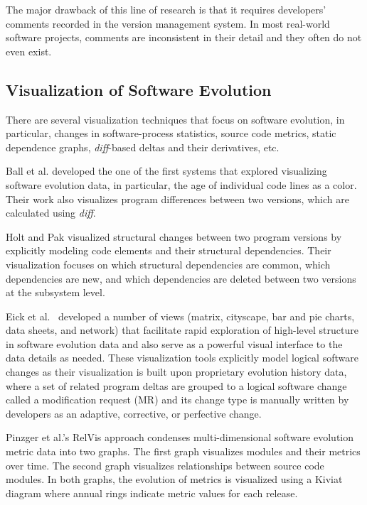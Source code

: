 \documentclass[runningheads,a4paper]{llncs}
\begin{document}
The major drawback of this line of research is that it requires developers' comments recorded in the version management system. In most real-world software projects, comments are inconsistent in their detail and they often do not even exist. 

\subsection{Visualization of Software Evolution} 
There are several visualization techniques that focus on software evolution, in particular, changes in software-process statistics, source code metrics, static dependence graphs, {\it diff}-based deltas and their derivatives, etc. 

Ball et al. \cite{Ball1996} developed the one of the first systems that \cite{Ball1996} explored visualizing software evolution data, in particular, the age of individual code lines as a color. Their work also visualizes program differences between two versions, which are calculated using {\it diff}.

Holt and Pak \cite{Holt1996} visualized structural changes between two program versions by explicitly modeling code elements and their structural dependencies. Their visualization focuses on which structural dependencies are common, which dependencies are new, and which dependencies are deleted between two versions at the subsystem level. 


Eick et al.~\cite{Eick2002} developed a number of views (matrix, cityscape, bar and pie charts, data sheets, and network) that facilitate rapid exploration of high-level structure in software evolution data and also serve as a powerful visual interface to the data details as needed. These visualization tools explicitly model logical software changes as their visualization is built upon proprietary evolution history data, where a set of related program deltas are grouped to a logical software change called a modification request (MR) and its change type is manually written by developers as an adaptive, corrective, or perfective change. 

Pinzger et al.'s RelVis approach \cite{Pinzger2005} condenses multi-dimensional software evolution metric data into two graphs. The first graph visualizes modules and their metrics over time. The second graph visualizes relationships between source code modules. In both graphs, the evolution of metrics is visualized using a Kiviat diagram where annual rings indicate metric values for each release.
\end{document}
